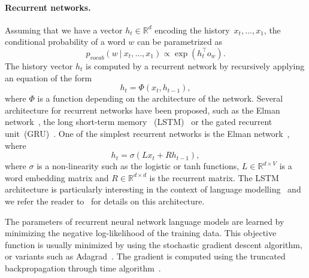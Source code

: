 \documentclass{article} \usepackage{iclr2017_conference,times}
\begin{document}
\paragraph{Recurrent networks.}
Assuming that we have a vector $h_t \in \mathbb{R}^d$ encoding the history~$x_t, ..., x_1$, the conditional probability of 
a word $w$ can be parametrized as
\begin{equation*}
p_{vocab}( w \ | \ x_t, ..., x_1) \propto \exp(h_t^{\top} o_w).
\end{equation*}
The history vector $h_t$ is computed by a recurrent network by recursively applying 
an equation of the form
\begin{equation*}
h_t = \Phi\left(x_t, h_{t-1} \right),
\end{equation*}
where $\Phi$ is a function depending on the architecture of the network.
Several architecture for recurrent networks have been proposed, such as the
Elman network~\citep{elman1990finding}, the long short-term memory~
(LSTM)~\citep{hochreiter1997long} or the gated recurrent
unit~(GRU)~\citep{chung2014empirical}.
One of the simplest recurrent networks is the Elman network~\citep{elman1990finding}, where
\begin{equation*}
h_t = \sigma \left( L x_t + R h_{t-1} \right),
\end{equation*}
where $\sigma$ is a non-linearity such as the logistic or tanh functions, $L
\in \mathbb{R}^{d \times V}$ is a word embedding matrix and $R \in
\mathbb{R}^{d \times d}$ is the recurrent matrix.
The LSTM architecture is particularly interesting in the context of language modelling~\citep{jozefowicz2016exploring}
and we refer the reader to~\cite{graves2013speech} for details on this architecture. 

The parameters of recurrent neural network language models are learned by
minimizing the negative log-likelihood of the training data.  This objective
function is usually minimized by using the stochastic gradient descent
algorithm, or variants such as Adagrad~\citep{duchi2011adaptive}.  The gradient
is computed using the truncated backpropagation through time
algorithm~\citep{werbos1990backpropagation,williams1990efficient}.
\end{document}
